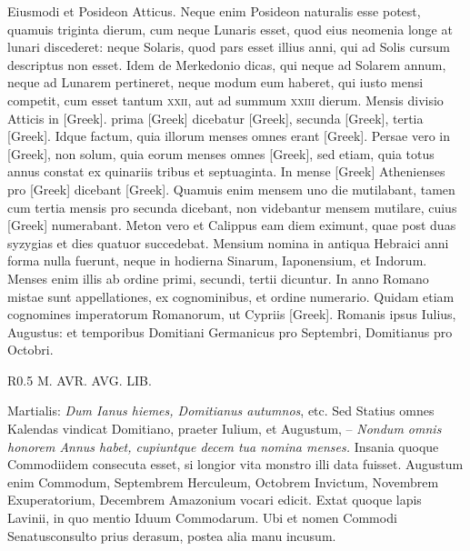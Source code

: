 Eiusmodi et Posideon Atticus.
Neque enim Posideon
naturalis esse potest, quamuis triginta dierum, cum neque Lunaris
esset, quod eius neomenia longe at lunari discederet: neque Solaris,
quod pars esset illius anni, qui ad Solis cursum descriptus non esset.
Idem de Merkedonio dicas, qui neque ad Solarem annum, neque ad
Lunarem pertineret, neque modum eum haberet, qui iusto mensi
competit, cum esset tantum \textsc{xxii}, aut ad summum \textsc{xxiii} dierum.
Mensis divisio Atticis in \textgreek{[Greek]}.
 prima \textgreek{[Greek]} dicebatur \textgreek{[Greek]},
secunda \textgreek{[Greek]}, tertia \textgreek{[Greek]}.
Idque factum, quia
illorum menses omnes erant \textgreek{[Greek]}.
Persae vero in \textgreek{[Greek]},
non solum, quia eorum menses omnes \textgreek{[Greek]}, sed etiam, quia
totus annus constat ex quinariis tribus et septuaginta.
In mense \textgreek{[Greek]}
Athenienses pro \textgreek{[Greek]} dicebant \textgreek{[Greek]}.
Quamuis
enim mensem uno die mutilabant, tamen cum tertia mensis
pro secunda dicebant, non videbantur mensem mutilare, cuius
\textgreek{[Greek]} numerabant.
Meton vero et Calippus eam diem eximunt,
quae post duas syzygias et dies quatuor succedebat.
Mensium nomina
in antiqua Hebraici anni forma nulla fuerunt, neque in hodierna
Sinarum, Iaponensium, et Indorum.
Menses enim illis ab ordine
primi, secundi, tertii dicuntur.
In anno Romano mistae sunt appellationes,
ex cognominibus, et ordine numerario.
Quidam etiam cognomines
imperatorum Romanorum, ut Cypriis \textgreek{[Greek]}.
Romanis ipsus Iulius, Augustus: et temporibus Domitiani
Germanicus pro Septembri, Domitianus pro Octobri.
\begin{wrapfigure}[16]{R}{0.5\textwidth}
  \centering
  {M. AVR. AVG. LIB.}
\end{wrapfigure}
Martialis:
 \textit{Dum Ianus hiemes, Domitianus
autumnos}, etc.
Sed Statius omnes
Kalendas vindicat Domitiano,
praeter Iulium, et Augustum,
– \textit{Nondum omnis honorem
Annus habet, cupiuntque decem tua
nomina menses.}
Insania quoque
Commodiidem consecuta esset, si
longior vita monstro illi data fuisset.
Augustum enim Commodum,
Septembrem Herculeum, Octobrem
Invictum, Novembrem
Exuperatorium, Decembrem
Amazonium vocari edicit.
Extat
quoque lapis Lavinii, in quo mentio
Iduum Commodarum.
Ubi et
nomen Commodi Senatusconsulto prius derasum, postea alia manu
incusum.

